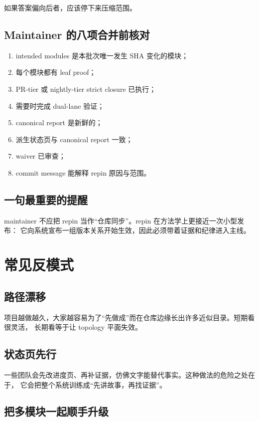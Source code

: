\documentclass[UTF8,11pt,a4paper,oneside]{ctexbook}
\begin{document}
如果答案偏向后者，应该停下来压缩范围。

\section{Maintainer 的八项合并前核对}

\begin{enumerate}
  \item intended modules 是本批次唯一发生 SHA 变化的模块；
  \item 每个模块都有 leaf proof；
  \item PR-tier 或 nightly-tier strict closure 已执行；
  \item 需要时完成 dual-lane 验证；
  \item canonical report 是新鲜的；
  \item 派生状态页与 canonical report 一致；
  \item waiver 已审查；
  \item commit message 能解释 repin 原因与范围。
\end{enumerate}

\section{一句最重要的提醒}

maintainer 不应把 repin 当作“仓库同步”。repin 在方法学上更接近一次小型发布：
它向系统宣布一组版本关系开始生效，因此必须带着证据和纪律进入主线。

\chapter{常见反模式}

\section{路径漂移}

项目越做越久，大家越容易为了“先做成”而在仓库边缘长出许多近似目录。短期看很灵活，
长期看等于让 topology 平面失效。

\section{状态页先行}

一些团队会先改进度页、再补证据，仿佛文字能替代事实。这种做法的危险之处在于，
它会把整个系统训练成“先讲故事，再找证据”。

\section{把多模块一起顺手升级}
\end{document}
